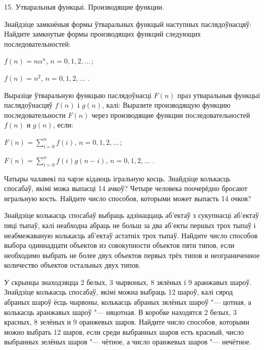 



\biLangHeader
{15. Утваральныя функцыі.}
{Производящие функции.}

\begin{problemList}

\problemItemWithCommonPart
{Знайдзіце замкнёныя формы ўтваральных функцый наступных паслядоўнасцяў:}
{Найдите замкнутые формы производящих функций следующих последовательностей:}
{\begin{belarusianEnumerate}
  \item $f(n) = n\alpha^n$, $n = 0, 1, 2, \ldots\, $;
  \item $f(n) = n^2$, $n = 0, 1, 2, \ldots\,\, $.
\end{belarusianEnumerate}}

\bigskip

\problemItemWithCommonPart
{Выразіце ўтваральную функцыю паслядоўнасці $F(n)$ праз утваральныя функцыі
паслядоўнасцяў $f(n)$ і $g(n)$, калі:}
{Выразите производящую функцию последовательности $F(n)$ через производящие
функции последовательностей $f(n)$ и $g(n)$, если:}
{\begin{belarusianEnumerate}
  \item $F(n) = \sum \limits _{i = 0}^n f(i)$, $n = 0, 1, 2, \ldots\, $;
  \item $F(n) = \sum \limits _{i = 0}^n f(i)g(n - i)$, $n = 0, 1, 2, \ldots\,\, $.
\end{belarusianEnumerate}}

\bigskip

\problemItemSimple
{Чатыры чалавекі па чарзе кідаюць ігральную косць. Знайдзіце колькасць спосабаў,
якімі можа выпасці 14 ачкоў?}
{Четыре человека поочерёдно бросают игральную кость. Найдите число способов,
которыми может выпасть 14 очков?}

\bigskip

\problemItemSimple
{Знайдзіце колькасць спосабаў выбраць адзінаццаць аб'ектаў з сукупнасці аб'ектаў
пяці тыпаў, калі неабходна абраць не больш за два аб'екты першых трох тыпаў і неабмежаваную
колькасць аб'ектаў астатніх трох тыпаў.}
{Найдите число способов выбора одиннадцати объектов из совокупности объектов
пяти типов, если необходимо выбрать не более двух объектов первых трёх типов и
неограниченное количество объектов остальных двух типов.}

\bigskip

\problemItemSimple
{У скрынцы знаходзяцца 2 белых, 3 чырвоных, 8 зялёных і 9 аранжавых шароў.
Знайдзіце колькасць спосабаў, якімі можна выбраць 12 шароў, калі сярод абраных шароў
ёсць чырвоны, колькасць абраных зялёных шароў "--- цотная, а колькасць аранжавых шароў "--- няцотная.}
{В коробке находятся 2 белых, 3 красных, 8 зелёных и 9 оранжевых шаров.
Найдите число способов, которыми можно выбрать 12 шаров, если среди выбранных шаров
есть красный, число выбранных зелёных шаров "--- чётное, а число оранжевых шаров "--- нечётное.}


\end{problemList}
